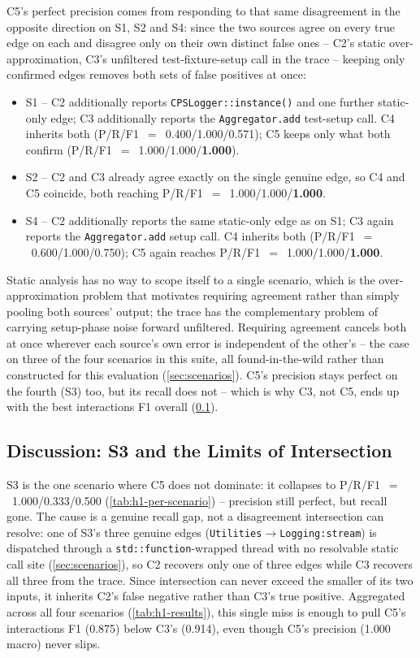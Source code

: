 C5's perfect precision comes from responding to that same disagreement
in the opposite direction on S1, S2 and S4: since the two sources agree
on every true edge on each and disagree only on their own distinct
false ones -- C2's static over-approximation, C3's unfiltered
test-fixture-setup call in the trace -- keeping only confirmed edges
removes both sets of false positives at once:

\begin{itemize}
  \item S1 -- C2 additionally reports \texttt{CPSLogger::instance()}
    and one further static-only edge; C3 additionally reports the
    \texttt{Aggregator.add} test-setup call. C4 inherits both
    (P/R/F1~$=$~0.400/1.000/0.571); C5 keeps only what both confirm
    (P/R/F1~$=$~1.000/1.000/\textbf{1.000}).
  \item S2 -- C2 and C3 already agree exactly on the single genuine
    edge, so C4 and C5 coincide, both reaching
    P/R/F1~$=$~1.000/1.000/\textbf{1.000}.
  \item S4 -- C2 additionally reports the same static-only edge as on
    S1; C3 again reports the \texttt{Aggregator.add} setup call. C4
    inherits both (P/R/F1~$=$~0.600/1.000/0.750); C5 again reaches
    P/R/F1~$=$~1.000/1.000/\textbf{1.000}.
\end{itemize}

Static analysis has no way to scope itself to a single scenario, which
is the over-approximation problem that motivates requiring agreement
rather than simply pooling both sources' output; the trace has the
complementary problem of carrying setup-phase noise forward unfiltered.
Requiring agreement cancels both at once wherever each source's own
error is independent of the other's -- the case on three of the four
scenarios in this suite, all found-in-the-wild rather than constructed
for this evaluation (\cref{sec:scenarios}). C5's precision stays perfect
on the fourth (S3) too, but its recall does not -- which is why C3, not
C5, ends up with the best interactions F1 overall (\cref{sec:h1-c4c3}).

\subsection{Discussion: S3 and the Limits of Intersection}\label{sec:h1-c4c3}

S3 is the one scenario where C5 does not dominate: it collapses to
P/R/F1~$=$~1.000/0.333/0.500 (\cref{tab:h1-per-scenario}) -- precision
still perfect, but recall gone. The cause is a genuine recall gap, not a
disagreement intersection can resolve: one of S3's three genuine edges
(\texttt{Utilities}$\to$\texttt{Logging:stream}) is dispatched through a
\texttt{std::function}-wrapped thread with no resolvable static call
site (\cref{sec:scenarios}), so C2 recovers only one of three edges
while C3 recovers all three from the trace. Since intersection can
never exceed the smaller of its two inputs, it inherits C2's false
negative rather than C3's true positive. Aggregated across all four
scenarios (\cref{tab:h1-results}), this single miss is enough to pull
C5's interactions F1 (0.875) below C3's (0.914), even though C5's
precision (1.000 macro) never slips.

